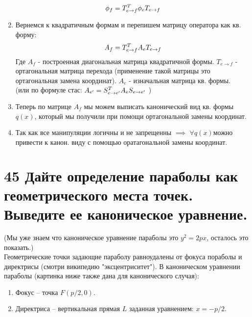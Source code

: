 \documentclass[a4paper,12pt]{article}
\begin{document}
\begin{enumerate}
\[\]
\[
\phi_{f} = T_{e \rightarrow f}^{{\small T}} \phi_{e} T_{e \rightarrow f}
\]
\item Вернемся к квадратичным формам и перепишем матрицу оператора как кв. форму:
\[
A_{f} = T_{e \rightarrow f}^{{\small T}} A_{e} T_{e \rightarrow f}
\]
Где $ A_{f} $ - построенная диагональная матрица квадратичной формы. 
$ T_{e \rightarrow f} $ - ортагональная матрица перехода (применение такой матрицы это ортагональная замена координат). 
$ A_{e} $ - изначальная матрица кв. формы. \\
(или по формуле стас: $A_{e'} = S_{e \rightarrow e'}^{{\small T}} A_{e} S_{e \rightarrow e'} $ )
\item Теперь по матрице $A_{f}$ мы можем выписать канонический вид кв. формы $q(x)$, который мы получили при помощи ортагональной замены координат.
\item Так как все манипуляции логичны и не запрещенны $ \implies $ $ \forall q(x) $можно привести к канон. виду с помощью оратагональной замены координат.
\end{enumerate}


\section{45 Дайте определение параболы как геометрического места точек. Выведите  ее каноническое уравнение.}
(Мы уже знаем что каноническое уравнение параболы это $y^2 = 2px$, осталось это показать.)  \\
Геометрические точки задающие параболу равноудалены от фокуса пораболы и 
директрисы (смотри википедию "эксцентриситет").
В каноническом уравнении параболы (картинка ниже также дана для канонического случая):
\begin{enumerate}
\item[] Фокус  – точка $ F(p/2, 0) $. 
\item[] Директриса – вертикальная прямая $L$ заданная 
уравнением: $ x = -p/2 $.
\end{enumerate}

\begin{center}
\end{center}
\end{document}
